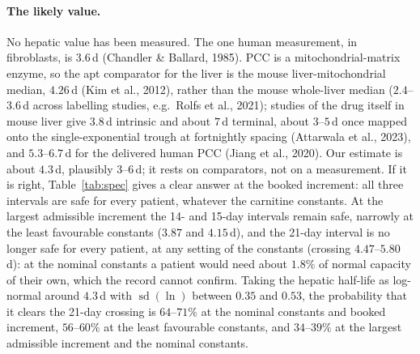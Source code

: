 \documentclass[11pt,a4paper]{article}
\begin{document}
\paragraph{The likely value.} No hepatic value has been measured. The one human measurement,
in fibroblasts, is $3.6$\,d (Chandler \& Ballard, 1985). PCC is a mitochondrial-matrix
enzyme, so the apt comparator for the liver is the mouse liver-mitochondrial median,
$4.26$\,d (Kim et al., 2012), rather than the mouse whole-liver median ($2.4$--$3.6$\,d across labelling studies, e.g.\
Rolfs et al., 2021); studies of
the drug itself in mouse liver give $3.8$\,d intrinsic and about $7$\,d terminal, about
$3$--$5$\,d once mapped onto the single-exponential trough at fortnightly spacing (Attarwala
et al., 2023), and $5.3$--$6.7$\,d for the delivered human PCC (Jiang et al., 2020). Our
estimate is about $4.3$\,d, plausibly $3$--$6$\,d; it rests on comparators, not on a
measurement. If it is right, Table~\ref{tab:spec} gives a clear answer at the booked increment:
all three intervals are safe for every patient, whatever the carnitine constants. At the
largest admissible increment the 14- and 15-day intervals remain safe, narrowly at the least
favourable constants ($3.87$ and $4.15$\,d), and the 21-day interval is no longer safe for every
patient, at any setting of the constants (crossing $4.47$--$5.80$\,d): at the nominal constants a
patient would need about $1.8\%$ of normal capacity of their own, which the record cannot
confirm. Taking the
hepatic half-life as log-normal around $4.3$\,d with $\operatorname{sd}(\ln)$ between $0.35$
and $0.53$, the probability that it clears the 21-day crossing is $64$--$71\%$ at the nominal
constants and booked increment, $56$--$60\%$ at the least favourable constants, and $34$--$39\%$ at
the largest admissible increment and the nominal constants.
\end{document}
